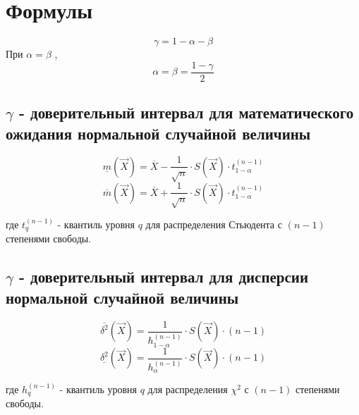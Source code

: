 \chapter{Формулы}

$$\gamma = 1 - \alpha - \beta$$
При $\alpha = \beta$ , $$\alpha = \beta = \frac{1 - \gamma}{2}$$

\section{$\gamma$ - доверительный интервал для математического ожидания нормальной случайной величины}
$$ \underline{m}(\vec{X}) = \overline{X} - \frac{1}{\sqrt{n}} \cdot S(\vec{X}) \cdot t_{1 - \alpha}^{(n - 1)} $$
$$ \overline{m}(\vec{X}) = \overline{X} + \frac{1}{\sqrt{n}} \cdot S(\vec{X}) \cdot t_{1 - \alpha}^{(n - 1)} $$

где $t_{q}^{(n - 1)}$ - квантиль уровня $q$ для распределения Стьюдента с $(n − 1)$ степенями свободы.

\section{$\gamma$ - доверительный интервал для дисперсии нормальной случайной величины}
$$ \overline{\delta^2}(\vec{X}) = \frac{1}{h^{(n - 1)}_{1 - \alpha}} \cdot S(\vec{X}) \cdot (n - 1) $$
$$ \underline{\delta^2}(\vec{X}) = \frac{1}{h^{(n - 1)}_{\alpha}} \cdot S(\vec{X}) \cdot (n - 1) $$

где $h_{q}^{(n - 1)}$ - квантиль уровня $q$ для распределения $\chi^2$ с $(n − 1)$ степенями свободы.